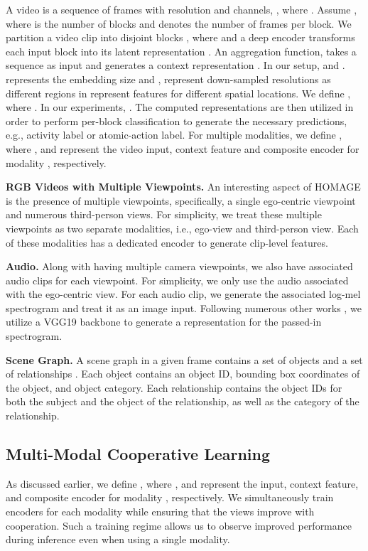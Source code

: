 \documentclass[final]{cvpr}
\begin{document}
A video  is a sequence of  frames with resolution  and  channels, , where . Assume , where  is the number of blocks and  denotes the number of frames per block. We partition a video clip  into  disjoint blocks , where  and a deep encoder  transforms each input block  into its latent representation . An aggregation function,  takes a sequence  as input and generates a context representation . In our setup,  and .  represents the embedding size and ,  represent down-sampled resolutions as different regions in  represent features for different spatial locations. We define , where . In our experiments, . The computed representations are then utilized in order to perform per-block classification to generate the necessary predictions, e.g., activity label or atomic-action label. For multiple modalities, we define , where ,  and  represent the video input, context feature and composite encoder for modality , respectively.


\noindent\textbf{RGB Videos with Multiple Viewpoints.} An interesting aspect of HOMAGE is the presence of multiple viewpoints, specifically, a single ego-centric viewpoint and numerous third-person views. For simplicity, we treat these multiple viewpoints as two separate modalities, i.e., ego-view and third-person view. Each of these modalities has a dedicated encoder to generate clip-level features.

\noindent\textbf{Audio.} Along with having multiple camera viewpoints, we also have associated audio clips for each viewpoint. For simplicity, we only use the audio associated with the ego-centric view. For each audio clip, we generate the associated log-mel spectrogram \cite{logmel} and treat it as an image input. Following numerous other works \cite{afouras2020self, korbar2018cooperative}, we utilize a VGG19 backbone to generate a representation for the passed-in spectrogram.

\noindent\textbf{Scene Graph.} A scene graph in a given frame  contains a set of objects  and a set of relationships . Each object  contains an object ID, bounding box coordinates of the object, and object category. Each relationship  contains the object IDs for both the subject and the object of the relationship, as well as the category of the relationship.


\subsection{Multi-Modal Cooperative Learning}

As discussed earlier, we define , where ,  and  represent the input, context feature, and composite encoder for modality , respectively. We simultaneously train encoders for each modality while ensuring that the views improve with cooperation. Such a training regime allows us to observe improved performance during inference even when using a single modality. 
\end{document}
